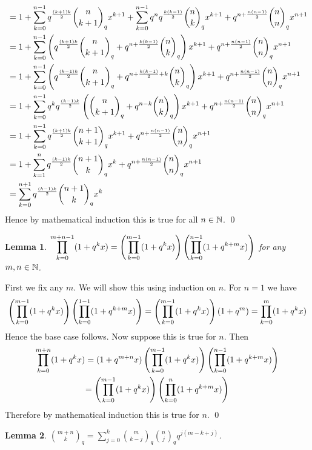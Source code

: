 \documentclass[a4paper, 11pt]{article}
\newtheorem{lemma}{Lemma}
\renewenvironment{proof}{\noindent{\it \textbf{Proof:}}\hspace*{1em}}{\hfill\qed\bigskip\\}
\begin{document}
{\begin{itemize}
\begin{itemize}
\begin{proof}
\begin{align*}
		& =1+ \sum_{k=0}^{n-1} q^{\frac{(k+1)k}2}\binom{n}{k+1}_qx^{k+1} + \sum_{k=0}^{n-1} q^n q^{\frac{k(k-1)}2}\binom{n}{k}_qx^{k+1}+q^{n+\frac{n(n-1)}{2}}\binom{n}{n}_q x^{n+1}\\
		& = 1+ \sum_{k=0}^{n-1}\left(  q^{\frac{(k+1)k}2}\binom{n}{k+1}_q + q^{n+\frac{k(k-1)}2}\binom{n}{k}_q  \right)x^{k+1}+ q^{n+\frac{n(n-1)}{2}}\binom{n}{n}_q x^{n+1}\\
		& = 1+ \sum_{k=0}^{n-1}\left(  q^{\frac{(k-1)k}2}\binom{n}{k+1}_q + q^{n+\frac{k(k-1)}2+k}\binom{n}{k}_q  \right)x^{k+1}+ q^{n+\frac{n(n-1)}{2}}\binom{n}{n}_q x^{n+1}\\
			& = 1+ \sum_{k=0}^{n-1}  q^kq^{\frac{(k-1)k}2}\left(\binom{n}{k+1}_q + q^{n-k}\binom{n}{k}_q  \right)x^{k+1}+ q^{n+\frac{n(n-1)}{2}}\binom{n}{n}_q x^{n+1}\\
		& = 1+ \sum_{k=0}^{n-1}  q^{\frac{(k+1)k}2}\binom{n+1}{k+1}_qx^{k+1}+ q^{n+\frac{n(n-1)}{2}}\binom{n}{n}_q x^{n+1}\\
		& = 1+ \sum_{k=1}^{n}  q^{\frac{(k-1)k}2}\binom{n+1}{k}_qx^{k}+ q^{n+\frac{n(n-1)}{2}}\binom{n}{n}_q x^{n+1}\\
		& = \sum_{k=0}^{n+1}  q^{\frac{(k-1)k}2}\binom{n+1}{k}_qx^{k}
	\end{align*} Hence by mathematical induction this is true for all $n\in\mathbb{N}$. 
\end{proof}
\begin{lemma}\label{breakqprod}
	$\displaystyle{\prod_{k=0}^{m+n-1}(1+q^kx)=\left(  \prod_{k=0}^{m-1}(1+q^kx)\right)\left( \prod_{k=0}^{n-1}(1+q^{k+m}x) \right)}$ for any $m,n\in\mathbb{N}$.
\end{lemma}
\begin{proof}
	First we fix any $m$. We will show this using induction on $n$. For $n=1$ we have $$\left(  \prod_{k=0}^{m-1}(1+q^kx)\right)\left( \prod_{k=0}^{1-1}(1+q^{k+m}x)\right) =\left(  \prod_{k=0}^{m-1}(1+q^kx)\right)(1+q^m)=\prod_{k=0}^{m}(1+q^k x)$$Hence the base case follows. Now suppose this is true for $n$. Then \begin{multline*}
		\prod_{k=0}^{m+n}(1+q^kx) = (1+q^{m+n}x)\left(  \prod_{k=0}^{m-1}(1+q^kx)\right)\left( \prod_{k=0}^{n-1}(1+q^{k+m}x) \right)\\
		=\left(  \prod_{k=0}^{m-1}(1+q^kx)\right)\left( \prod_{k=0}^{n}(1+q^{k+m}x) \right)
	\end{multline*}Therefore by mathematical induction this is true for $n$. 
\end{proof}
\begin{lemma}\label{qvandermonde}
	${\displaystyle {\binom {m+n}{k}}_{\!\!q}=\sum _{j=0}^k{\binom {m}{k-j}}_{\!\!q}{\binom {n}{j}}_{\!\!q}q^{j(m-k+j)}}$.

\end{lemma}
\end{itemize}
\end{itemize}}
\end{document}
